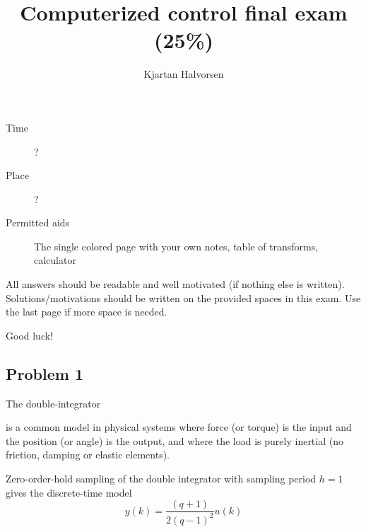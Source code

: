 \documentclass[letter,12pt]{article}
\title{Computerized control final exam (25\%)}
\author{Kjartan Halvorsen}
\newcommand{\bmpl}{\begin{minipage}[t]{\textwidth}}
\newcommand{\emp}{\end{minipage}}
\begin{document}
\maketitle


\begin{description}
\item[Time] ?
\item[Place] ?
\item[Permitted aids] The single colored page with your own notes, table of transforms, calculator
\end{description}

All answers should be readable and well motivated (if nothing else is written). Solutions/motivations should be written on the provided spaces in this exam. Use the last page if more space is needed.

\begin{center}
{\Large Good luck!} \\
\end{center}

\noindent
\fbox{
\bmpl
{\bf Matricula and name:}\\
\vspace*{30mm}
\emp}

\clearpage



\subsection*{Problem 1}
The double-integrator
\begin{center}
\end{center}
is a common model in physical systems where force (or torque) is the input and the position (or angle) is the output, and where the load is purely inertial (no friction, damping or elastic elements).

Zero-order-hold sampling of the double integrator with sampling period $h=1$ gives the discrete-time model
\begin{equation}
 y(k) = \frac{(q+1)}{2(q-1)^2} u(k) 
\label{eq:doubleint}
\end{equation}
\end{document}

